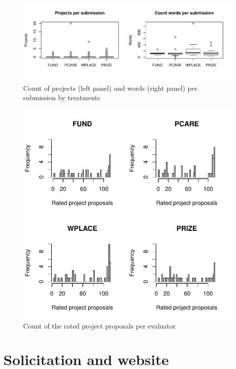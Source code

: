 \documentclass[11pt, titlepage]{article}
\begin{document}
\begin{figure} 
  \centering
  \caption{Count of projects (left panel) and words (right panel) per submission by treatments}
  \label{fig: counts}
  \includegraphics{Figures/counts-1.pdf}
\end{figure}

\begin{figure}
\centering
\caption{Count of the rated project proposals per evaluator}
\label{app: rating counts}
\includegraphics{Figures/plot-ratings-appendix-1.pdf}
\end{figure}

\section{Solicitation and website}\label{solicitation-and-website}
\end{document}

